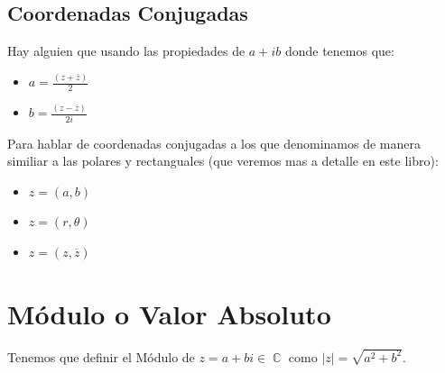\documentclass[12pt, fleqn]{report}                             %
\newcommand \Over {\overline}                                   %
\DeclareMathOperator \Complexs  {\mathbb{C}}                     %
\begin{document}
            \clearpage
            \subsection{Coordenadas Conjugadas}

                Hay alguien que usando las propiedades de $a + ib$
                donde tenemos que:
                \begin{itemize}
                    \item $a = \frac{(z + \Over{z})}{2}$
                    \item $b = \frac{(z - \Over{z})}{2i}$
                \end{itemize}

                Para hablar de coordenadas conjugadas a los que denominamos
                de manera similiar a las polares y rectanguales (que veremos
                mas a detalle en este libro):
                \begin{itemize}
                    \item $z = (a, b)$
                    \item $z = (r, \theta)$
                    \item $z = (z, \Over{z})$
                \end{itemize}







        \clearpage
        \section{Módulo o Valor Absoluto}
            Tenemos que definir el Módulo de $z = a+bi \in \Complexs$ como $|z| = \sqrt{a^2 + b^2}$.
\end{document}
